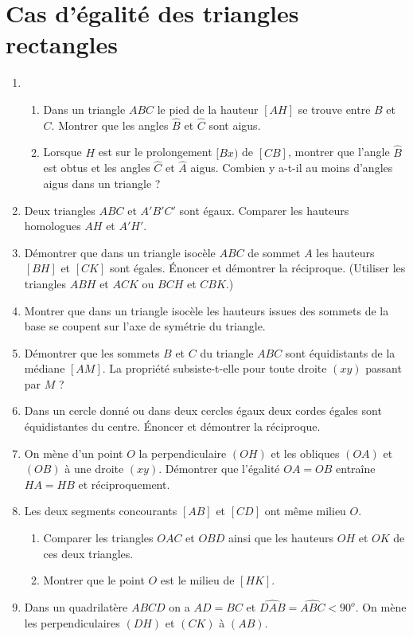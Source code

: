 
\chapter{Cas d'égalité des triangles rectangles}
\begin{enumerate}
\item \begin{enumerate}
\item Dans un triangle $ABC$ le pied de la hauteur $[AH]$ se trouve entre $B$ et $C$.
Montrer que les angles $\widehat{B}$ et $\widehat{C}$ sont aigus. 
\item Lorsque $H$ est sur le prolongement $[Bx)$ de $[CB]$, montrer que l'angle $\widehat{B}$ est obtus et les angles $\widehat{C}$ et $\widehat{A}$ aigus. Combien
y a-t-il au moins d'angles aigus dans un triangle ? 
\end{enumerate}
\item Deux triangles $ABC$ et $A'B'C'$ sont égaux. Comparer les hauteurs homologues 
$AH$ et $A'H'$.
\item Démontrer que dans un triangle isocèle $ABC$ de sommet $A$ les hauteurs $[BH]$ et $[CK]$ sont égales. Énoncer et démontrer la réciproque. (Utiliser les triangles 
$ABH$ et $ACK$ ou $BCH$ et $CBK$.)
\item Montrer que dans un triangle isocèle les hauteurs issues des sommets de la base se coupent sur l'axe de symétrie du triangle. 
\item Démontrer que les sommets $B$ et $C$ du triangle $ABC$ sont équidistants de la médiane $[AM]$. La propriété subsiste-t-elle pour toute droite $(xy)$ passant par $M$ ?
\item Dans un cercle donné ou dans deux cercles égaux deux cordes égales sont équidistantes du centre. Énoncer et démontrer la réciproque. 
\item On mène d'un point $O$ la perpendiculaire $(OH)$ et les obliques $(OA)$ et $(OB)$ à une droite $(xy)$. Démontrer que l'égalité $OA=OB$ entraîne $HA=HB$ et réciproquement. 
\item Les deux segments concourants $[AB]$ et $[CD]$ ont même milieu $O$. 
\begin{enumerate}
\item Comparer les triangles $OAC$ et $OBD$ ainsi que les hauteurs $OH$ et $OK$ de ces deux triangles. 
\item Montrer que le point $O$ est le milieu de $[HK]$.
\end{enumerate}
\item Dans un quadrilatère $ABCD$ on a $AD=BC$ et $\widehat{DAB}= \widehat{ABC}<90^o$. On mène les perpendiculaires $(DH)$ et $(CK)$ à $(AB)$. \begin{enumerate}

\end{enumerate}
\end{enumerate}
